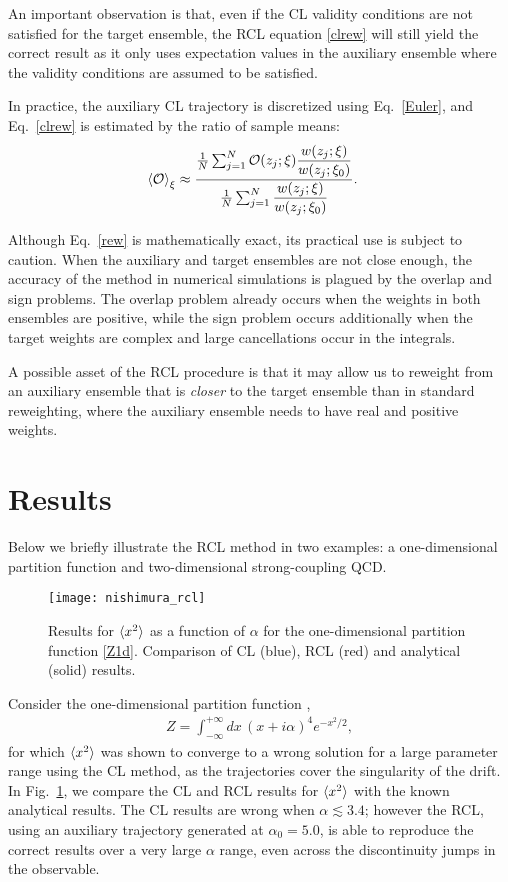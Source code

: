 \documentclass[prd,showpacs,reprint,nofootinbib,showkeys]{revtex4-1}
\newcommand{\Obs}{{\cal O}}
\begin{document}
An important observation is that, even if the CL validity conditions are not satisfied for the target ensemble, the RCL equation \eqref{clrew} will still yield the correct result as it only uses expectation values in the auxiliary ensemble where the validity conditions are assumed to be satisfied.

In practice, the auxiliary CL trajectory is discretized using  Eq.\ \eqref{Euler}, and Eq.\ \eqref{clrew} is estimated by the ratio of sample means:
\begin{align}
\braket{\Obs}_{\xi}
&\approx \frac{\frac1N \sum_{j=1}^N \Obs(z_j;\xi) \dfrac{w(z_j;\xi)}{w(z_j;\xi_0)}}
{\frac1N \sum_{j=1}^N \dfrac{w(z_j;\xi)}{w(z_j;\xi_0)}} .
\label{RCL}
\end{align}

Although Eq.\ \eqref{rew} is mathematically exact, its practical use is subject to caution. When the auxiliary and target ensembles are not close enough, the accuracy of the method in numerical simulations is plagued by the overlap and sign problems. The overlap problem already occurs when the weights in both ensembles are positive, while the sign problem occurs additionally when the target weights are complex and large cancellations occur in the integrals.

A possible asset of the RCL procedure is that it may allow us to reweight from an auxiliary ensemble that is \textit{closer} to the target ensemble than in standard reweighting, where the auxiliary ensemble needs to have real and positive weights.

\section{Results}
\label{sec:results}

Below we briefly illustrate the RCL method in two examples: a one-dimensional partition function and two-dimensional strong-coupling QCD. 

\begin{figure}
\centerline{\texttt{[image: nishimura\_rcl]}}
\caption{\label{Fig:1d}Results for $\braket{x^2}$ as a function of $\alpha$ for the one-dimensional partition function \eqref{Z1d}. Comparison of CL (blue), RCL (red) and analytical (solid) results.}
\end{figure}

Consider the one-dimensional partition function \cite{Nishimura:2015pba},
\begin{align}
Z = \int_{-\infty}^{+\infty} dx\,(x+i\alpha)^4 e^{-x^2/2} ,
\label{Z1d}
\end{align}
for which $\braket{x^2}$ was shown to converge to a wrong solution for a large parameter range using the CL method, as the trajectories cover the singularity of the drift. In Fig.~\ref{Fig:1d}, we compare the CL and RCL results for $\braket{x^2}$ with the known analytical results. The CL results are wrong when $\alpha\lesssim3.4$; however the RCL, using an auxiliary trajectory generated at $\alpha_0=5.0$, is able to reproduce the correct results over a very large $\alpha$ range, even across the discontinuity jumps in the observable.
\end{document}
